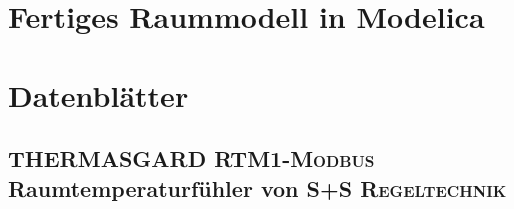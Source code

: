 \appendix
\chapter{Fertiges Raummodell in Modelica}
\label{att:raummod}

\chapter{Datenblätter}
\section{\textsc{THERMASGARD RTM1-Modbus} Raumtemperaturfühler von \textsc{S+S Regeltechnik}}
\label{att:rtm1}